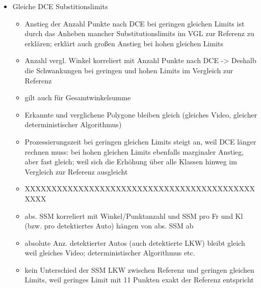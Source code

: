 {\begin{itemize}
		
		
		\item Gleiche DCE Substitionslimits
		\begin{itemize}
			\item Anstieg der Anzahl Punkte nach DCE bei geringen gleichen Limits ist durch das Anheben mancher Substitutionslimits im VGL zur Referenz zu erklären; erklärt auch großen Anstieg bei hohen gleichen Limits
			\item Anzahl vergl. Winkel korreliert mit Anzahl Punkte nach DCE -> Deshalb die Schwankungen bei geringen und hohen Limits im Vergleich zur Referenz
			\item gilt auch für Gesamtwinkelsumme
			\item Erkannte und verglichene Polygone bleiben gleich (gleiches Video, gleicher deterministischer Algorithmus)
			\item Prozessierungszeit bei geringen gleichen Limits steigt an, weil DCE länger rechnen muss: bei hohen gleichen Limits ebenfalls marginaler Anstieg, aber fast gleich; weil sich die Erhöhung über alle Klassen hinweg im Vergleich zur Referenz ausgleicht
			\item XXXXXXXXXXXXXXXXXXXXXXXXXXXXXXXXXXXXXXXXXXXXXXX
			\item abs. SSM korreliert mit Winkel/Punktanzahl und SSM pro Fr und Kl (bzw. pro detektiertes Auto) hängen von abs. SSM ab
			\item absolute Anz. detektierter Autos (auch detektierte LKW) bleibt gleich weil gleiches Video; deterministischer Algorithmus etc.
			\item kein Unterschied der SSM LKW zwischen Referenz und geringen gleichen Limits, weil geringes Limit mit 11 Punkten exakt der Referenz entspricht
	
		\end{itemize}


\end{itemize}}
